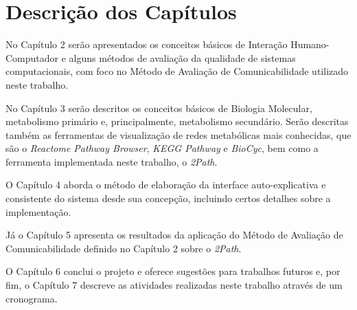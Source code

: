 \section{Descrição dos Capítulos}
\indent No Capítulo 2 serão apresentados os conceitos básicos de Interação Humano-Computador e alguns métodos de avaliação da qualidade de sistemas computacionais, com foco no Método de Avaliação de Comunicabilidade utilizado neste trabalho.

\indent No Capítulo 3 serão descritos os conceitos básicos de Biologia Molecular, metabolismo primário e, principalmente, metabolismo secundário. Serão descritas também as ferramentas de visualização de redes metabólicas mais conhecidas, que são o \textit{Reactome Pathway Browser}, \textit{KEGG Pathway} e \textit{BioCyc}, bem como a ferramenta implementada neste trabalho, o \textit{2Path}.

\indent O Capítulo 4 aborda o método de elaboração da interface auto-explicativa e consistente do sistema desde sua concepção, incluindo certos detalhes sobre a implementação.

\indent Já o Capítulo 5 apresenta os resultados da aplicação do Método de Avaliação de Comunicabilidade definido no Capítulo 2 sobre o \textit{2Path}.

\indent O Capítulo 6  conclui o projeto e oferece sugestões para trabalhos futuros e, por fim, o Capítulo 7 descreve as atividades realizadas neste trabalho através de um cronograma.
